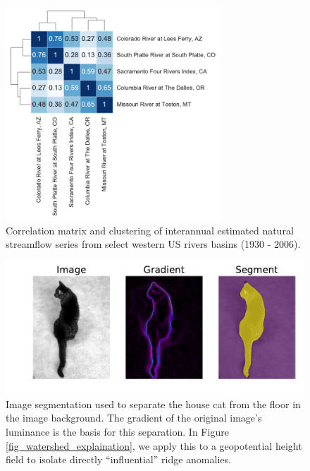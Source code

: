 \documentclass[final, double]{ua-thesis}
\begin{document}
\begin{figure}[ht]
 \centerline{\includegraphics[width=19pc]{p2figures/fig_river_cluster.pdf}}
  \caption{Correlation matrix and clustering of interannual estimated natural streamflow series from select western US rivers basins (1930 - 2006).}\label{fig_river_cluster}
\end{figure}

\begin{figure}[ht]
 \centerline{\includegraphics[width=39pc]{p2figures/fig_cat_segmentation.pdf}}
  \caption{Image segmentation used to separate the house cat from the floor in the image background. The gradient of the original image's luminance is the basis for this separation. In Figure \ref{fig_watershed_explaination}, we apply this to a geopotential height field to isolate directly ``influential'' ridge anomalies.}\label{fig_cat_segmentation}
\end{figure}
\end{document}
